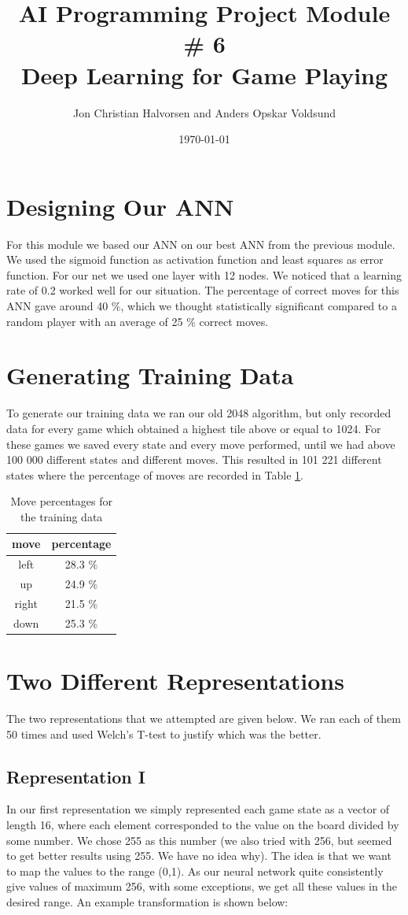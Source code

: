 \documentclass[11pt,a4paper]{article}
\author{Jon Christian Halvorsen and Anders Opskar Voldsund}
\title{ \textbf{ AI Programming Project Module \# 6 }  \\
Deep Learning for Game Playing }
\date{\today}
\begin{document}
\maketitle

\section*{Designing Our ANN}
For this module we based our ANN on our best ANN from the previous module. We used the sigmoid function as activation function and least squares as error function. For our net we used one layer with 12 nodes. We noticed that a learning rate of 0.2 worked well for our situation. The percentage of correct moves for this ANN gave around 40 $\%$, which we thought statistically significant compared to a random player with an average of 25 $\%$ correct moves.

\section*{Generating Training Data}
To generate our training data we ran our old 2048 algorithm, but only recorded data for every game which obtained a highest tile above or equal to 1024. For these games we saved every state and every move performed, until we had above 100 000 different states and different moves. This resulted in 101 221 different states where the percentage of moves are recorded in Table \ref{tab:percantage}.

\begin{table}[h!]
\centering
\caption{Move percentages for the training data}
\begin{tabular}{cc}
move & percentage \\
\hline
left & 28.3 $\%$ \\
up & 24.9 $\%$ \\
right & 21.5 $\%$ \\
down & 25.3 $\%$
\end{tabular}
\label{tab:percantage}
\end{table}

\section*{Two Different Representations}
The two representations that we attempted are given below. We ran each of them 50 times and used Welch's T-test to justify which was the better.

\subsection*{Representation I}
In our first representation we simply represented each game state as a vector of length 16, where each element corresponded to the value on the board divided by some number. We chose 255 as this number (we also tried with 256, but seemed to get better results using 255. We have no idea why). The idea is that we want to map the values to the range (0,1). As our neural network quite consistently give values of maximum 256, with some exceptions, we get all these values in the desired range. An example transformation is shown below:
\end{document}
